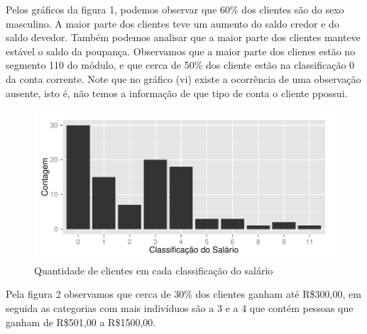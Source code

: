 \documentclass{article}\usepackage[]{graphicx}\usepackage[]{color}
\makeatletter
\def\maxwidth{ %
  \ifdim\Gin@nat@width>\linewidth
    \linewidth
  \else
    \Gin@nat@width
  \fi
}
\newenvironment{knitrout}{}{} %
\makeatother
\begin{document}
Pelos gráficos da figura 1, podemos observar que 60\% dos clientes são do sexo masculino. A maior parte dos clientes teve um aumento do saldo credor e do saldo devedor. Também podemos analisar que a maior parte dos clientes manteve estável o saldo da poupança. Observamos que a maior parte dos clienes estão no segmento 110 do módulo, e que cerca de 50\% dos cliente estão na classificação 0 da conta corrente. Note que no gráfico (vi) existe a ocorrência de uma observação ausente, isto é, não temos a informação de que tipo de conta o cliente ppossui.

\begin{figure}[t!]

\centering
\begin{knitrout}
\color{fgcolor}
\includegraphics[width=\maxwidth]{figure/unnamed-chunk-3} 

\end{knitrout}
\caption{Quantidade de clientes em cada classificação do salário}
\end{figure}

Pela figura 2 observamos que cerca de 30\% dos clientes ganham até R\$300,00, em seguida as categorias com mais indivíduos são a 3 e a 4 que contém pessoas que ganham de R\$501,00 a R\$1500,00.
\end{document}
